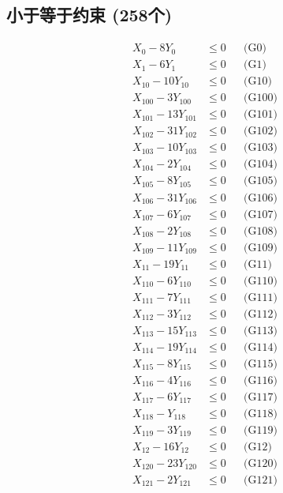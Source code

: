 \documentclass[a4paper,10pt]{article}
\begin{document}
\subsection{小于等于约束 (258个)}

\allowdisplaybreaks
{\small\begin{align}
X_{0} - 8Y_{0} &\leq 0 && \text{(G0)} \\
X_{1} - 6Y_{1} &\leq 0 && \text{(G1)} \\
X_{10} - 10Y_{10} &\leq 0 && \text{(G10)} \\
X_{100} - 3Y_{100} &\leq 0 && \text{(G100)} \\
X_{101} - 13Y_{101} &\leq 0 && \text{(G101)} \\
X_{102} - 31Y_{102} &\leq 0 && \text{(G102)} \\
X_{103} - 10Y_{103} &\leq 0 && \text{(G103)} \\
X_{104} - 2Y_{104} &\leq 0 && \text{(G104)} \\
X_{105} - 8Y_{105} &\leq 0 && \text{(G105)} \\
X_{106} - 31Y_{106} &\leq 0 && \text{(G106)} \\
X_{107} - 6Y_{107} &\leq 0 && \text{(G107)} \\
X_{108} - 2Y_{108} &\leq 0 && \text{(G108)} \\
X_{109} - 11Y_{109} &\leq 0 && \text{(G109)} \\
X_{11} - 19Y_{11} &\leq 0 && \text{(G11)} \\
X_{110} - 6Y_{110} &\leq 0 && \text{(G110)} \\
X_{111} - 7Y_{111} &\leq 0 && \text{(G111)} \\
X_{112} - 3Y_{112} &\leq 0 && \text{(G112)} \\
X_{113} - 15Y_{113} &\leq 0 && \text{(G113)} \\
X_{114} - 19Y_{114} &\leq 0 && \text{(G114)} \\
X_{115} - 8Y_{115} &\leq 0 && \text{(G115)} \\
\allowbreak
X_{116} - 4Y_{116} &\leq 0 && \text{(G116)} \\
X_{117} - 6Y_{117} &\leq 0 && \text{(G117)} \\
X_{118} - Y_{118} &\leq 0 && \text{(G118)} \\
X_{119} - 3Y_{119} &\leq 0 && \text{(G119)} \\
X_{12} - 16Y_{12} &\leq 0 && \text{(G12)} \\
X_{120} - 23Y_{120} &\leq 0 && \text{(G120)} \\
X_{121} - 2Y_{121} &\leq 0 && \text{(G121)} \\

\end{align}}
\end{document}
